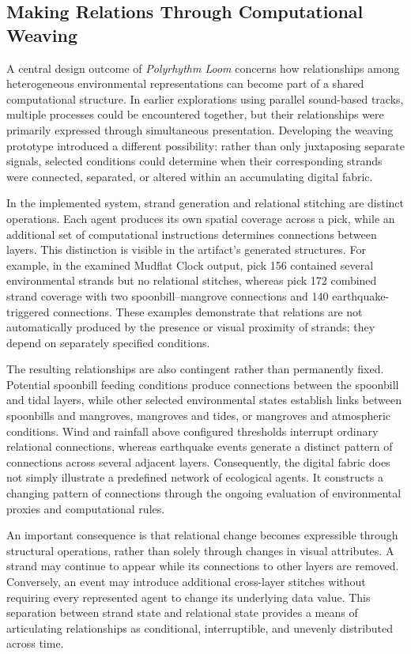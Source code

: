 \documentclass[manuscript,review,anonymous]{acmart}
\begin{document}
\subsection{Making Relations Through Computational Weaving}

A central design outcome of \emph{Polyrhythm Loom} concerns how relationships among heterogeneous environmental representations can become part of a shared computational structure. In earlier explorations using parallel sound-based tracks, multiple processes could be encountered together, but their relationships were primarily expressed through simultaneous presentation. Developing the weaving prototype introduced a different possibility: rather than only juxtaposing separate signals, selected conditions could determine when their corresponding strands were connected, separated, or altered within an accumulating digital fabric.

In the implemented system, strand generation and relational stitching are distinct operations. Each agent produces its own spatial coverage across a pick, while an additional set of computational instructions determines connections between layers. This distinction is visible in the artifact's generated structures. For example, in the examined Mudflat Clock output, pick 156 contained several environmental strands but no relational stitches, whereas pick 172 combined strand coverage with two spoonbill–mangrove connections and 140 earthquake-triggered connections. These examples demonstrate that relations are not automatically produced by the presence or visual proximity of strands; they depend on separately specified conditions.

The resulting relationships are also contingent rather than permanently fixed. Potential spoonbill feeding conditions produce connections between the spoonbill and tidal layers, while other selected environmental states establish links between spoonbills and mangroves, mangroves and tides, or mangroves and atmospheric conditions. Wind and rainfall above configured thresholds interrupt ordinary relational connections, whereas earthquake events generate a distinct pattern of connections across several adjacent layers. Consequently, the digital fabric does not simply illustrate a predefined network of ecological agents. It constructs a changing pattern of connections through the ongoing evaluation of environmental proxies and computational rules.

An important consequence is that relational change becomes expressible through structural operations, rather than solely through changes in visual attributes. A strand may continue to appear while its connections to other layers are removed. Conversely, an event may introduce additional cross-layer stitches without requiring every represented agent to change its underlying data value. This separation between strand state and relational state provides a means of articulating relationships as conditional, interruptible, and unevenly distributed across time.
\end{document}
